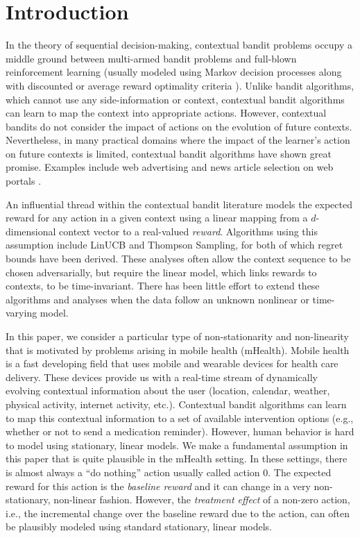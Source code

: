 \section{Introduction}



In the theory of sequential decision-making, contextual bandit problems \citep{tewari2017ads} occupy a middle ground between multi-armed bandit problems \citep{bubeck2012regret} and full-blown reinforcement learning (usually modeled using Markov decision processes along with discounted or average reward optimality criteria \citep{sutton1998reinforcement,puterman2005markov}). Unlike bandit algorithms, which cannot use any side-information or context, contextual bandit algorithms can learn to map the context into appropriate actions. However, contextual bandits do not consider the impact of actions on the evolution of future contexts. Nevertheless, in many practical domains where the impact of the learner's action on future contexts is limited, contextual bandit algorithms have shown great promise. Examples include web advertising \citep{abe1999learning} and news article selection on web portals \citep{li2010contextual}.

An influential thread within the contextual bandit literature models the expected reward for any action in a given context using a linear mapping from a $d$-dimensional context vector to a real-valued \emph{reward}.
Algorithms using this assumption include LinUCB and Thompson Sampling, for both of which regret bounds have been derived. These analyses often allow the context sequence to be chosen adversarially, but require the linear model, which links rewards to contexts, to be time-invariant. There has been little effort to extend these algorithms and analyses when the data follow an unknown nonlinear or time-varying model. 

In this paper, we consider a particular type of non-stationarity and non-linearity that is motivated by problems arising in mobile health (mHealth). Mobile health is a fast developing field that uses mobile and wearable devices for health care delivery. These devices provide us with a real-time stream of dynamically evolving contextual information about the user (location, calendar, weather, physical activity, internet activity, etc.). Contextual bandit algorithms can learn to map this contextual information to a set of available intervention options (e.g., whether or not to send a medication reminder). However, human behavior is hard to model using stationary, linear models. We make a fundamental assumption in this paper that is quite plausible in the mHealth setting. In these settings, there is almost always a ``do nothing'' action usually called action $0$. The expected reward for this action is the \emph{baseline reward} and it can change in a very non-stationary, non-linear fashion. However, the \emph{treatment effect} of a non-zero action, i.e., the incremental change over the baseline reward due to the action, can often be plausibly modeled using standard stationary, linear models.

